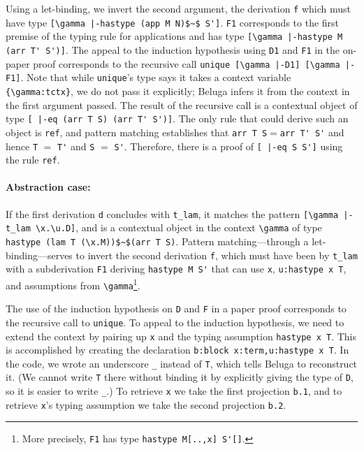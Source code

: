 Using a let-binding, we invert the second
argument, the derivation \lstinline{f} which
must have type
\lstinline![\gamma |-hastype (app M N)$~$ S']!. \lstinline!F1!
corresponds to the first premise of the typing rule for applications
and has type \lstinline![\gamma |-hastype M (arr T' S')]!.
The appeal to the induction hypothesis using \lstinline{D1} and \lstinline{F1} in the
on-paper proof
corresponds to the recursive call
 \lstinline!unique [\gamma |-D1] [\gamma |-F1]!.
Note that while \lstinline!unique!'s type says it takes a context variable \lstinline!{\gamma:tctx}!,
we do not pass it explicitly; Beluga infers it from the context in the first argument
passed.
The result of the recursive call is a contextual object of type
\lstinline![ |-eq (arr T S) (arr T' S')]!. The only rule that
could derive such an object is \lstinline{ref}, and pattern matching
establishes that \lstinline!arr T S!$=$\lstinline!arr T' S'! and hence
\lstinline!T! $=$ \lstinline!T'! and \lstinline!S! $=$ \lstinline!S'!.
Therefore, there is a proof of \lstinline![ |-eq S S']! using the
rule \lstinline!ref!.

 \paragraph{Abstraction case:}
  If the first derivation \lstinline{d} concludes with \lstinline{t_lam}, it matches
 the pattern \lstinline{[\gamma |-t_lam \x.\u.D]}, and is
 a contextual object in the context \lstinline!\gamma! of type
 \lstinline{hastype (lam T (\x.M))$~$(arr T S)}.
 Pattern matching---through a let-binding---serves to invert the second derivation \lstinline{f}, which
 must have been by \lstinline{t_lam} with a subderivation
 \lstinline{F1} deriving \lstinline{hastype M S'} that can use \lstinline{x},
 \lstinline{u:hastype x T}, and assumptions from \lstinline!\gamma!\footnote{More precisely, \lstinline!F1! has type \lstinline!hastype M[..,x] S'[]!.}.

 The use of the induction hypothesis on \lstinline{D} and \lstinline{F} in a paper proof
 corresponds to the recursive call to \lstinline{unique}.  To appeal to the
 induction hypothesis, we need to extend the context by pairing up \lstinline{x} and
 the typing assumption \lstinline!hastype x T!. This is accomplished by creating
 the declaration \lstinline!b:block x:term,u:hastype x T!.  In the
 code, we wrote an underscore \lstinline!_! instead of \lstinline{T},
 which tells Beluga to reconstruct it.  (We cannot write \lstinline{T} there without binding it by
 explicitly giving the type of \lstinline{D}, so it is easier to write \lstinline!_!.)
 To retrieve \lstinline{x} we take the first projection
 \lstinline{b.1}, and to retrieve \lstinline{x}'s typing assumption we take the second projection \lstinline{b.2}.

